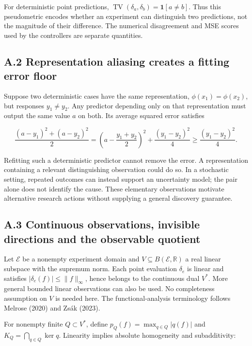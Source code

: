 \documentclass[11pt,a4paper]{article}
\begin{document}
For deterministic point predictions, \(\operatorname{TV}(\delta_a,\delta_b)=\mathbf 1[a\ne b]\). Thus this pseudometric encodes whether an experiment can distinguish two predictions, not the magnitude of their difference. The numerical disagreement and MSE scores used by the controllers are separate quantities.


\subsection*{A.2 Representation aliasing creates a fitting error floor}

Suppose two deterministic cases have the same representation, \(\phi(x_1)=\phi(x_2)\), but responses \(y_1\ne y_2\). Any predictor depending only on that representation must output the same value \(a\) on both. Its average squared error satisfies


\[
\frac{(a-y_1)^2+(a-y_2)^2}{2}
=\left(a-\frac{y_1+y_2}{2}\right)^2
+\frac{(y_1-y_2)^2}{4}
\geq\frac{(y_1-y_2)^2}{4}.
\]


Refitting such a deterministic predictor cannot remove the error. A representation containing a relevant distinguishing observation could do so. In a stochastic setting, repeated outcomes can instead support an uncertainty model; the pair alone does not identify the cause. These elementary observations motivate alternative research actions without supplying a general discovery guarantee.


\subsection*{A.3 Continuous observations, invisible directions and the observable quotient}

Let \(\mathcal E\) be a nonempty experiment domain and \(V\subseteq B(\mathcal E,\mathbb R)\) a real linear subspace with the supremum norm. Each point evaluation \(\delta_e\) is linear and satisfies \(|\delta_e(f)|\leq\|f\|_\infty\), hence belongs to the continuous dual \(V^*\). More general bounded linear observations can also be used. No completeness assumption on \(V\) is needed here. The functional-analysis terminology follows Melrose (2020) and Zsák (2023).


For nonempty finite \(Q\subset V^*\), define \(p_Q(f)=\max_{q\in Q}|q(f)|\) and \(K_Q=\bigcap_{q\in Q}\ker q\). Linearity implies absolute homogeneity and subadditivity:
\end{document}
